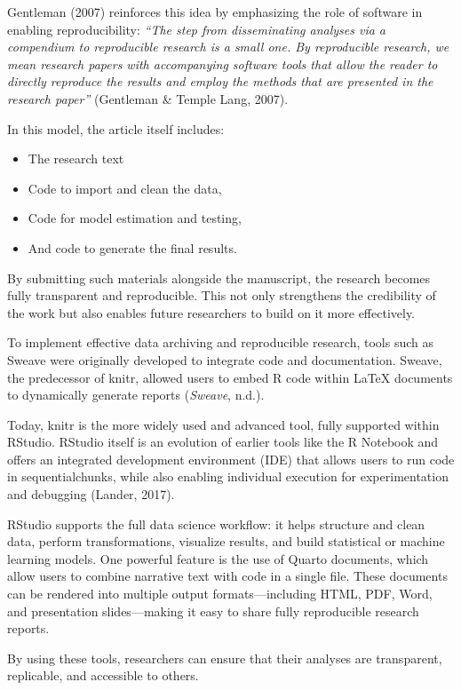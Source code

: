 \documentclass[
  british,
  a4paper,
]{article}
\begin{document}
Gentleman (2007) reinforces this idea by emphasizing the role of
software in enabling reproducibility: \emph{``The step from
disseminating analyses via a compendium to reproducible research is a
small one. By reproducible research, we mean research papers with
accompanying software tools that allow the reader to directly reproduce
the results and employ the methods that are presented in the research
paper''} (Gentleman \& Temple Lang, 2007).

In this model, the article itself includes:

\begin{itemize}
\item
  The research text
\item
  Code to import and clean the data,
\item
  Code for model estimation and testing,
\item
  And code to generate the final results.
\end{itemize}

By submitting such materials alongside the manuscript, the research
becomes fully transparent and reproducible. This not only strengthens
the credibility of the work but also enables future researchers to build
on it more effectively.

To implement effective data archiving and reproducible research, tools
such as Sweave were originally developed to integrate code and
documentation. Sweave, the predecessor of knitr, allowed users to embed
R code within LaTeX documents to dynamically generate reports
(\emph{Sweave}, n.d.).

Today, knitr is the more widely used and advanced tool, fully supported
within RStudio. RStudio itself is an evolution of earlier tools like the
R Notebook and offers an integrated development environment (IDE) that
allows users to run code in sequentialchunks, while also enabling
individual execution for experimentation and debugging (Lander, 2017).

RStudio supports the full data science workflow: it helps structure and
clean data, perform transformations, visualize results, and build
statistical or machine learning models. One powerful feature is the use
of Quarto documents, which allow users to combine narrative text with
code in a single file. These documents can be rendered into multiple
output formats---including HTML, PDF, Word, and presentation
slides---making it easy to share fully reproducible research reports.

By using these tools, researchers can ensure that their analyses are
transparent, replicable, and accessible to others.
\end{document}
